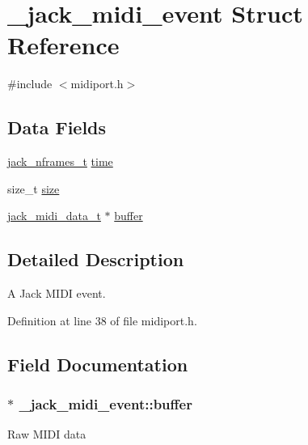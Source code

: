\hypertarget{struct__jack__midi__event}{\section{\-\_\-jack\-\_\-midi\-\_\-event \-Struct \-Reference}
\label{d1/dfe/struct__jack__midi__event}
}


{\ttfamily \#include $<$midiport.\-h$>$}

\subsection*{\-Data \-Fields}
\begin{DoxyCompactItemize}
\item 
\hyperlink{types_8h_aa954df532e901ae5172e68a23f3da9b6}{jack\-\_\-nframes\-\_\-t} \hyperlink{struct__jack__midi__event_a7acc6a81ac12e2a042d5af9fb7b56532}{time}
\item 
size\-\_\-t \hyperlink{struct__jack__midi__event_abc254ee669d342c75ccfa49658b54a56}{size}
\item 
\hyperlink{midiport_8h_ad1df9c73b07584ffb69c276421ff55c9}{jack\-\_\-midi\-\_\-data\-\_\-t} $\ast$ \hyperlink{struct__jack__midi__event_adebcb1577b20165e4da170f8992bc0ba}{buffer}
\end{DoxyCompactItemize}


\subsection{\-Detailed \-Description}
\-A \-Jack \-M\-I\-D\-I event. 

\-Definition at line 38 of file midiport.\-h.



\subsection{\-Field \-Documentation}
\hypertarget{struct__jack__midi__event_adebcb1577b20165e4da170f8992bc0ba}{
\subsubsection[{buffer}]{$\ast$ {\bf \-\_\-jack\-\_\-midi\-\_\-event\-::buffer}}}\label{d1/dfe/struct__jack__midi__event_adebcb1577b20165e4da170f8992bc0ba}
\-Raw \-M\-I\-D\-I data 

